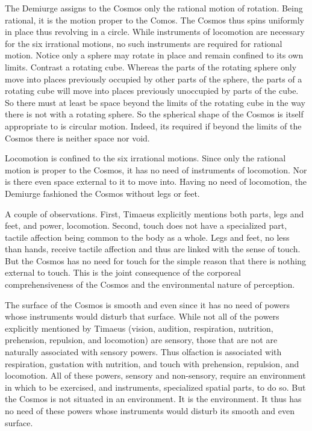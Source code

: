 The Demiurge assigns to the Cosmos only the rational motion of rotation. Being rational, it is the motion proper to the Comos. The Cosmos thus spins uniformly in place thus revolving in a circle. While instruments of locomotion are necessary for the six irrational motions, no such instruments are required for rational motion. Notice only a sphere may rotate in place and remain confined to its own limits. Contrast a rotating cube. Whereas the parts of the rotating sphere only move into places previously occupied by other parts of the sphere, the parts of a rotating cube will move into places previously unoccupied by parts of the cube. So there must at least be space beyond the limits of the rotating cube in the way there is not with a rotating sphere. So the spherical shape of the Cosmos is itself appropriate to is circular motion. Indeed, its required if beyond the limits of the Cosmos there is neither space nor void.



Locomotion is confined to the six irrational motions. Since only the rational motion is proper to the Cosmos, it has no need of instruments of locomotion. Nor is there even space external to it to move into. Having no need of locomotion, the Demiurge fashioned the Cosmos without legs or feet.

A couple of observations. First, Timaeus explicitly mentions both parts, legs and feet, and power, locomotion. Second, touch does not have a specialized part, tactile affection being common to the body as a whole. Legs and feet, no less than hands, receive tactile affection and thus are linked with the sense of touch. But the Cosmos has no need for touch for the simple reason that there is nothing external to touch. This is the joint consequence of the corporeal comprehensiveness of the Cosmos and the environmental nature of perception.

\vspace{\baselineskip} 

\noindent The surface of the Cosmos is smooth and even since it has no need of powers whose instruments would disturb that surface. While not all of the powers explicitly mentioned by Timaeus (vision, audition, respiration, nutrition, prehension, repulsion, and locomotion) are sensory, those that are not are naturally associated with sensory powers. Thus olfaction is associated with respiration, gustation with nutrition, and touch with prehension, repulsion, and locomotion. All of these powers, sensory and non-sensory, require an environment in which to be exercised, and instruments, specialized spatial parts, to do so. But the Cosmos is not situated in an environment. It is the environment. It thus has no need of these powers whose instruments would disturb its smooth and even surface.


